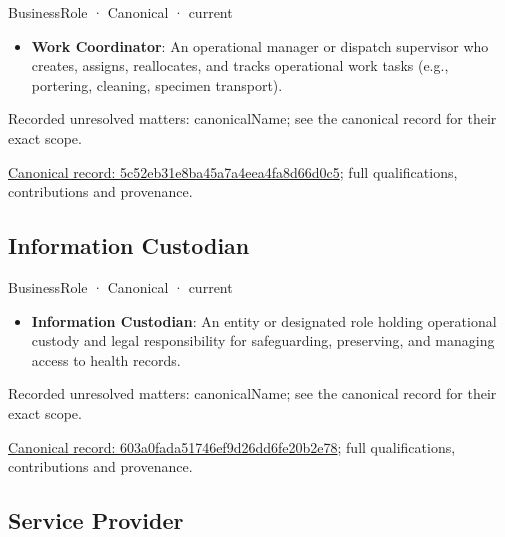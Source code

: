 \label{element:5c52eb31e8ba45a7a4eea4fa8d66d0c5}
{\small BusinessRole · Canonical · current}\par

\begin{itemize}


\item \textbf{Work Coordinator}: An operational manager or dispatch supervisor who creates, assigns, reallocates, and tracks operational work tasks (e.g., portering, cleaning, specimen transport).

\end{itemize}

{\small Recorded unresolved matters: canonicalName; see the canonical record for their exact scope.}\par
{\footnotesize \href{../../../../continuum/business/business-role/5c52eb31e8ba45a7a4eea4fa8d66d0c5.md}{Canonical record: 5c52eb31e8ba45a7a4eea4fa8d66d0c5}; full qualifications, contributions and provenance.}\par
\subsection{Information Custodian}

\label{element:603a0fada51746ef9d26dd6fe20b2e78}
{\small BusinessRole · Canonical · current}\par

\begin{itemize}


\item \textbf{Information Custodian}: An entity or designated role holding operational custody and legal responsibility for safeguarding, preserving, and managing access to health records.

\end{itemize}

{\small Recorded unresolved matters: canonicalName; see the canonical record for their exact scope.}\par
{\footnotesize \href{../../../../continuum/business/business-role/603a0fada51746ef9d26dd6fe20b2e78.md}{Canonical record: 603a0fada51746ef9d26dd6fe20b2e78}; full qualifications, contributions and provenance.}\par
\subsection{Service Provider}

